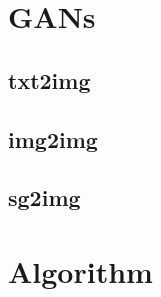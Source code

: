 \documentclass[a4paper,11pt]{texMemo} %
\begin{document}
\tableofcontents

\newpage
\section{GANs}

\subsection{txt2img}

\newpage
%

\subsection{img2img}
\newpage

\subsection{sg2img}
\newpage

\section{Algorithm}





\end{document}
